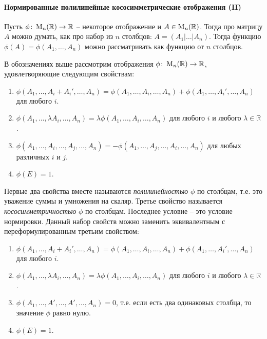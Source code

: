 \paragraph{Нормированные полилинейные кососимметрические отображения (II)} 

Пусть $\phi\colon \operatorname{M}_{n}(\mathbb R)\to \mathbb R$ -- некоторое отображение и $A\in\operatorname{M}_{n}(\mathbb R)$.
Тогда про матрицу $A$ можно думать, как про набор из $n$ столбцов: $A = (A_1|\ldots|A_n)$.
Тогда функцию $\phi(A) = \phi(A_1,\ldots,A_n)$ можно рассматривать как функцию от $n$ столбцов.

В обозначениях выше рассмотрим отображения $\phi\colon \operatorname{M}_{n}(\mathbb R)\to \mathbb R$, удовлетворяющие следующим свойствам:
\begin{enumerate}
\item $\phi(A_1,\ldots, A_i + A_i', \ldots, A_n) = \phi(A_1,\ldots, A_i, \ldots, A_n) + \phi(A_1,\ldots,A_i', \ldots, A_n)$ для любого $i$.

\item $\phi(A_1,\ldots, \lambda A_i, \ldots, A_n) = \lambda \phi(A_1,\ldots, A_i, \ldots, A_n)$ для любого $i$ и любого $\lambda\in\mathbb R$.

\item $\phi(A_1,\ldots, A_i, \ldots, A_j, \ldots, A_n) = -\phi(A_1,\ldots, A_j, \ldots, A_i, \ldots, A_n)$ для любых различных $i$ и $j$.

\item $\phi(E) = 1$.
\end{enumerate}

Первые два свойства вместе называются {\it полилинейностью} $\phi$ по столбцам, т.е. это уважение суммы и умножения на скаляр.
Третье свойство называется {\it кососимметричностью} $\phi$ по столбцам.
Последнее условие -- это условие нормировки.
Данный набор свойств можно заменить эквивалентным с переформулированным третьим свойством:
\begin{enumerate}
\item $\phi(A_1,\ldots, A_i + A_i', \ldots, A_n) = \phi(A_1,\ldots, A_i, \ldots, A_n) + \phi(A_1,\ldots,A_i', \ldots, A_n)$ для любого $i$.

\item $\phi(A_1,\ldots, \lambda A_i, \ldots, A_n) = \lambda \phi(A_1,\ldots, A_i, \ldots, A_n)$ для любого $i$ и любого $\lambda\in\mathbb R$.

\item $\phi(A_1,\ldots, A', \ldots, A', \ldots, A_n) = 0$, т.е. если есть два одинаковых столбца, то значение $\phi$ равно нулю.

\item $\phi(E) = 1$.
\end{enumerate}

